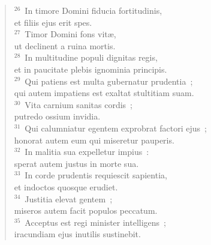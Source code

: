 \begin{flushleft}\begin{verse}${}^{26}$~In timore Domini fiducia fortitudinis,\\ et filiis ejus erit spes.\\
${}^{27}$~Timor Domini fons vit\ae ,\\ ut declinent a ruina mortis.\\
${}^{28}$~In multitudine populi dignitas regis,\\ et in paucitate plebis ignominia principis.\\
${}^{29}$~Qui patiens est multa gubernatur prudentia~;\\ qui autem impatiens est exaltat stultitiam suam.\\
${}^{30}$~Vita carnium sanitas cordis~;\\ putredo ossium invidia.\\
${}^{31}$~Qui calumniatur egentem exprobrat factori ejus~;\\ honorat autem eum qui miseretur pauperis.\\
${}^{32}$~In malitia sua expelletur impius~:\\ sperat autem justus in morte sua.\\
${}^{33}$~In corde prudentis requiescit sapientia,\\ et indoctos quosque erudiet.\\
${}^{34}$~Justitia elevat gentem~;\\ miseros autem facit populos peccatum.\\
${}^{35}$~Acceptus est regi minister intelligens~;\\ iracundiam ejus inutilis sustinebit.\end{verse}\end{flushleft}


